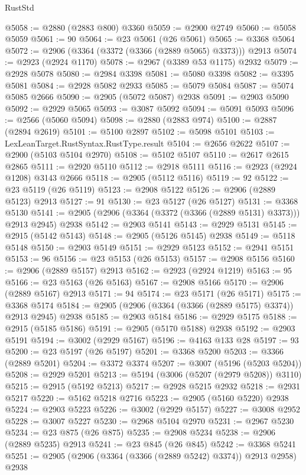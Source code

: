 \begin{lexlean}{RustStd}
\begin{coremodule}
@5058 := @2880 (@2883 @800) @3360
@5059 := @2900 @2749
@5060 := @5058 @5059
@5061 := 90
@5064 := @23 @5061 (@26 @5061)
@5065 := @3368 @5064
@5072 := @2906 (@3364 (@3372 (@3366 (@2889 @5065) @3373))) @2913
@5074 := @2923 (@2924 @1170)
@5078 := @2967 (@3389 @53 @1175) @2932
@5079 := @2928 @5078
@5080 := @2984 @3398
@5081 := @5080 @3398
@5082 := @3395 @5081
@5084 := @2928 @5082 @2933
@5085 := @5079 @5084
@5087 := @5074 @5085 @2666
@5090 := @2905 (@5072 @5087) @2938
@5091 := @2903 @5090
@5092 := @2929 @5065
@5093 := @3087 @5092
@5094 := @5091 @5093
@5096 := @2566 (@5060 @5094)
@5098 := @2880 (@2883 @974)
@5100 := @2887 (@2894 @2619)
@5101 := @5100 @2897
@5102 := @5098 @5101
@5103 := LexLeanTarget.RustSyntax.RustType.result
@5104 := @2656 @2622
@5107 := @2900 (@5103 @5104 @2970)
@5108 := @5102 @5107
@5110 := @2617 @2615 @2865
@5111 := @2920 @5110
@5112 := @2918 @5111
@5116 := @2923 (@2924 @1208) @3143 @2666
@5118 := @2905 (@5112 @5116)
@5119 := 92
@5122 := @23 @5119 (@26 @5119)
@5123 := @2908 @5122
@5126 := @2906 (@2889 @5123) @2913
@5127 := 91
@5130 := @23 @5127 (@26 @5127)
@5131 := @3368 @5130
@5141 := @2905 (@2906 (@3364 (@3372 (@3366 (@2889 @5131) @3373))) @2913 @2945) @2938
@5142 := @2903 @5141
@5143 := @2929 @5131
@5145 := @2915 (@5142 @5143)
@5148 := @2905 (@5126 @5145) @2938
@5149 := @5118 @5148
@5150 := @2903 @5149
@5151 := @2929 @5123
@5152 := @2941 @5151
@5153 := 96
@5156 := @23 @5153 (@26 @5153)
@5157 := @2908 @5156
@5160 := @2906 (@2889 @5157) @2913
@5162 := @2923 (@2924 @1219)
@5163 := 95
@5166 := @23 @5163 (@26 @5163)
@5167 := @2908 @5166
@5170 := @2906 (@2889 @5167) @2913
@5171 := 94
@5174 := @23 @5171 (@26 @5171)
@5175 := @3368 @5174
@5184 := @2905 (@2906 (@3364 (@3366 (@2889 @5175) @3374)) @2913 @2945) @2938
@5185 := @2903 @5184
@5186 := @2929 @5175
@5188 := @2915 (@5185 @5186)
@5191 := @2905 (@5170 @5188) @2938
@5192 := @2903 @5191
@5194 := @3002 (@2929 @5167)
@5196 := @4163 @133 @28
@5197 := 93
@5200 := @23 @5197 (@26 @5197)
@5201 := @3368 @5200
@5203 := @3366 (@2889 @5201)
@5204 := @3372 @3374
@5207 := @3007 (@5196 (@5203 @5204))
@5208 := @2929 @5201
@5213 := @5194 (@3006 (@5207 (@2979 @5208)) @3110)
@5215 := @2915 (@5192 @5213)
@5217 := @2928 @5215 @2932
@5218 := @2931 @5217
@5220 := @5162 @5218 @2716
@5223 := @2905 (@5160 @5220) @2938
@5224 := @2903 @5223
@5226 := @3002 (@2929 @5157)
@5227 := @3008 @2952
@5228 := @3007 @5227
@5230 := @2968 @5104 @2970
@5231 := @2967 @5230
@5234 := @23 @875 (@26 @875)
@5235 := @2908 @5234
@5238 := @2906 (@2889 @5235) @2913
@5241 := @23 @845 (@26 @845)
@5242 := @3368 @5241
@5251 := @2905 (@2906 (@3364 (@3366 (@2889 @5242) @3374)) @2913 @2958) @2938

\end{coremodule}
\end{lexlean}
